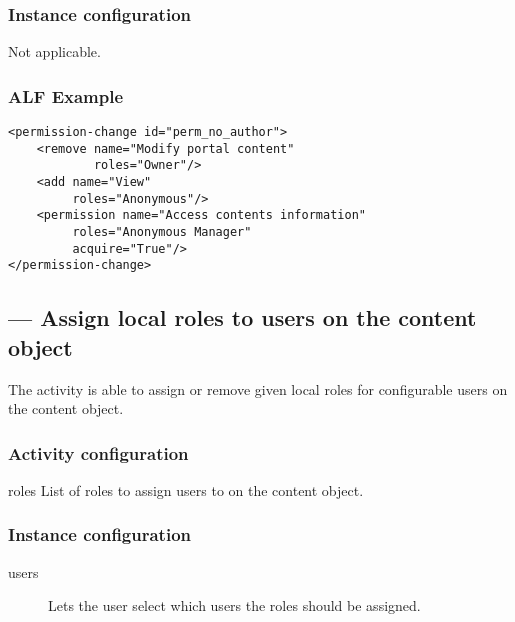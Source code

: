 \subsubsection{Instance configuration}

Not applicable.

\subsubsection{ALF Example}

\begin{verbatim}
<permission-change id="perm_no_author">
    <remove name="Modify portal content" 
            roles="Owner"/>
    <add name="View"
         roles="Anonymous"/>
    <permission name="Access contents information" 
         roles="Anonymous Manager" 
         acquire="True"/>
</permission-change>
\end{verbatim}

\subsection{ --- Assign local roles to users on the content object}

 
The  activity is able to assign or remove given local roles for configurable 
users on the content object. 
  
\subsubsection{Activity configuration}

\begin{memberdesc}{roles}
    List of roles to assign users to on the content object. 
\end{memberdesc}

\subsubsection{Instance configuration}

    \begin{description}
        \item[users] Lets the user select which users the roles should be assigned.
    \end{description}


